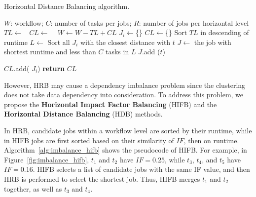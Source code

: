 \begin{algorithm}[!htb]
	\footnotesize
	\caption{Horizontal Distance Balancing algorithm.}
	\label{alg:imbalance_hdb}
	\begin{algorithmic}[1]
		\Require $W$: workflow; $C$: number of tasks per jobs; $R$: number of jobs per horizontal level
				\State $TL\gets $\  
				\State $CL\gets$  \  
				\State $W \gets W - TL + CL$   
			\EndFor
		\EndProcedure
			\State $J_i\gets$\{\}
			\EndFor
			\State $CL\gets$\{\}
			\State Sort $TL$ in descending of runtime
				\State $L\gets$ Sort all $J_i$ with the closest distance with $t$
				\State $J\gets$ the job with shortest runtime and less than $C$ tasks in $L$
				\State $J$.add ($t$) 
				
			\EndFor
			\State  $CL$.add( $J_i$)
			\EndFor
			\State \textbf{return} $CL$
		\EndProcedure
	\end{algorithmic}
\end{algorithm}





However, HRB may cause a dependency imbalance problem since the clustering does not take data dependency into consideration. To address this problem, we propose the \textbf{Horizontal Impact Factor Balancing} (HIFB) and the \textbf{Horizontal Distance Balancing} (HDB) methods. 

In HRB, candidate jobs within a workflow level are sorted by their runtime, while in HIFB jobs are first sorted based on their similarity of $IF$, then on runtime. 
Algorithm~\ref{alg:imbalance_hifb} shows the pseudocode of HIFB. 
For example, in Figure~\ref{fig:imbalance_hifb}, $t_1$ and $t_2$ have $IF = 0.25$, while $t_3$, $t_4$, and $t_5$ have $IF = 0.16$. HIFB selects a list of candidate jobs with the same IF value, and then HRB is performed to select the shortest job. Thus, HIFB merges $t_1$ and $t_2$ together, as well as $t_3$ and $t_4$.

